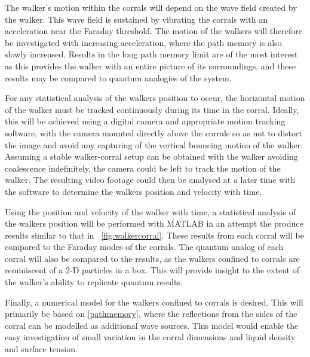 \documentclass[11pt]{article}
\newcommand{\figref}[2][\figurename~]{#1\ref{#2}}
\begin{document}
The walker's motion within the corrals will depend on the wave field created by the walker.  This wave field is sustained by vibrating the corrals with an acceleration near the Faraday threshold.  The motion  of the walkers will therefore be investigated with increasing acceleration, where the path memory is also slowly increased.  Results in the long path memory limit are of the most interest as this provides the walker with an entire picture of its surroundings, and these results may be compared to quantum analogies of the system.

For any statistical analysis of the walkers position to occur, the horizontal motion of the walker must be tracked continuously during its time in the corral.  Ideally, this will be achieved using a digital camera and appropriate motion tracking software, with the camera mounted directly above the corrals so as not to distort the image and avoid any capturing of the vertical bouncing motion of the walker.  Assuming a stable walker-corral setup can be obtained with the walker avoiding coalescence indefinitely, the camera could be left to track the motion of the walker.  The resulting video footage could then be analysed at a later time with the software to determine the walkers position and velocity with time.

Using the position and velocity of the walker with time, a statistical analysis of the walkers position will be performed with MATLAB in an attempt the produce results similar to that in \figref{fig:walkercorral}.  These results from each corral will be compared to the Faraday modes of the corrals.  The quantum analog of each corral will also be compared to the results, as the walkers confined to corrals are reminiscent of a 2-D particles in a box.  This will provide insight to the extent of the walker's ability to replicate quantum results.

Finally, a numerical model for the walkers confined to corrals is desired.  This will primarily be based on \eqref{pathmemory}, where the reflections from the sides of the corral can be modelled as additional wave sources.  This model would enable the easy investigation of small variation in the corral dimensions and liquid density and surface tension.
\end{document}
